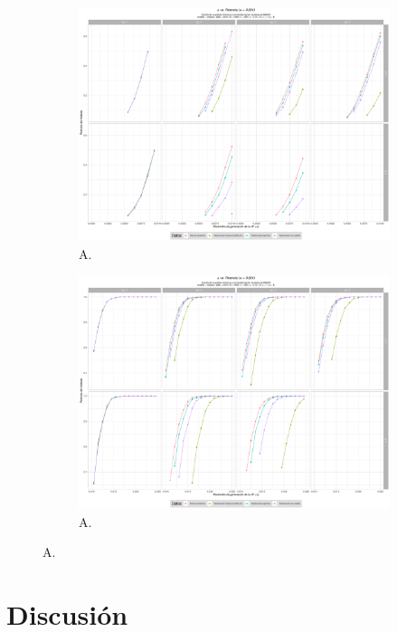 \documentclass[IB,BIB]{TFUOC}%
\begin{document}
\begin{figure}[!htbp]
\hspace*{-2cm} %
\begin{subfigure}{.65\textwidth}
  \centering
  \includegraphics[width=.7\linewidth]{OBJ2SimplexMANTAqloc0001ColaIzq.pdf}
  \caption{\scriptsize{A.}}
  \label{fig:OBJ2SimplexMANTAqloc0001ColaIzq}
\end{subfigure}%
\begin{subfigure}{.65\textwidth}
\hspace*{-2.3cm} %
  \centering
  \includegraphics[width=.7\linewidth]{OBJ2SimplexMANTAqloc0001Coladch.pdf}
  \caption{\scriptsize{A.}}
  \label{fig:OBJ2SimplexMANTAqloc0001Coladch}
\end{subfigure}
\caption{\scriptsize{A.}}
\label{fig:OBJ20001zoom}
\end{figure}


\chapter{Discusión}
\label{chap:Discusión}
\end{document}
